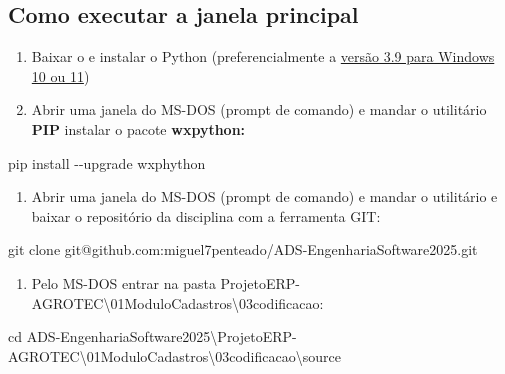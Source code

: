 \documentclass[
]{book}
\newenvironment{Shaded}{\begin{snugshade}}{\end{snugshade}}
\newcommand{\AttributeTok}[1]{\textcolor[rgb]{0.13,0.29,0.53}{#1}}
\newcommand{\BuiltInTok}[1]{#1}
\newcommand{\NormalTok}[1]{#1}
\providecommand{\tightlist}{%
  \setlength{\itemsep}{0pt}\setlength{\parskip}{0pt}}
\begin{document}
\subsection{Como executar a janela principal}\label{como-executar-a-janela-principal-1}

\begin{enumerate}
\def\labelenumi{\arabic{enumi}.}
\item
  Baixar o e instalar o Python (preferencialmente a \href{https://www.python.org/ftp/python/3.9.0/python-3.9.0-amd64.exe}{versão 3.9 para Windows 10 ou 11})
\item
  Abrir uma janela do MS-DOS (prompt de comando) e mandar o utilitário \textbf{PIP} instalar o pacote \textbf{wxpython:}
\end{enumerate}

\begin{Shaded}
\begin{Highlighting}[]
\NormalTok{pip install {-}}\AttributeTok{{-}upgrade}\NormalTok{ wxphython}
\end{Highlighting}
\end{Shaded}

\begin{enumerate}
\def\labelenumi{\arabic{enumi}.}
\setcounter{enumi}{2}
\tightlist
\item
  Abrir uma janela do MS-DOS (prompt de comando) e mandar o utilitário e baixar o repositório da disciplina com a ferramenta GIT:
\end{enumerate}

\begin{Shaded}
\begin{Highlighting}[]
\NormalTok{git clone git@github.com:miguel7penteado}\AttributeTok{/ADS{-}EngenhariaSoftware2025}\NormalTok{.git}
\end{Highlighting}
\end{Shaded}

\begin{enumerate}
\def\labelenumi{\arabic{enumi}.}
\setcounter{enumi}{3}
\tightlist
\item
  Pelo MS-DOS entrar na pasta ProjetoERP-AGROTEC\textbackslash01ModuloCadastros\textbackslash03codificacao\source :
\end{enumerate}

\begin{Shaded}
\begin{Highlighting}[]
\BuiltInTok{cd}\NormalTok{ ADS{-}EngenhariaSoftware2025\textbackslash{}ProjetoERP{-}AGROTEC\textbackslash{}01ModuloCadastros\textbackslash{}03codificacao\textbackslash{}source}
\end{Highlighting}
\end{Shaded}
\end{document}
